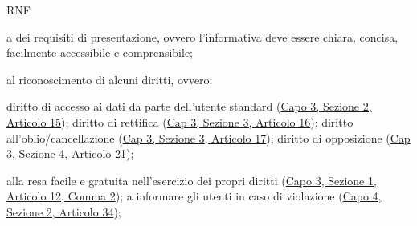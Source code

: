 \begin{listaPersonale}{RNF}
\begin{listaPersonale2}[RNF]{}
             a dei requisiti di presentazione, ovvero l'informativa deve essere chiara, concisa, facilmente accessibile e comprensibile;

             al riconoscimento di alcuni diritti, ovvero:
            \begin{listaPersonale3}[RNF]{}
                   diritto di accesso ai dati da parte dell'utente standard (\href{https://eur-lex.europa.eu/legal-content/IT/TXT/?uri=uriserv:OJ.L_.2016.119.01.0001.01.ITA&toc=OJ:L:2016:119:TOC#d1e2520-1-1}{Capo 3, Sezione 2, Articolo 15});
                   diritto di rettifica (\href{https://eur-lex.europa.eu/legal-content/IT/TXT/?uri=uriserv:OJ.L_.2016.119.01.0001.01.ITA&toc=OJ:L:2016:119:TOC#d1e2606-1-1}{Cap 3, Sezione 3, Articolo 16});
                   diritto all'oblio/cancellazione (\href{https://eur-lex.europa.eu/legal-content/IT/TXT/?uri=uriserv:OJ.L_.2016.119.01.0001.01.ITA&toc=OJ:L:2016:119:TOC#d1e2613-1-1}{Cap 3, Sezione 3, Articolo 17});
                   diritto di opposizione (\href{https://eur-lex.europa.eu/legal-content/IT/TXT/?uri=uriserv:OJ.L_.2016.119.01.0001.01.ITA&toc=OJ:L:2016:119:TOC#d1e2810-1-1}{Cap 3, Sezione 4, Articolo 21});
            \end{listaPersonale3}

             alla resa facile e gratuita nell'esercizio dei propri diritti (\href{https://eur-lex.europa.eu/legal-content/IT/TXT/?uri=uriserv:OJ.L_.2016.119.01.0001.01.ITA&toc=OJ:L:2016:119:TOC#d1e2189-1-1}{Capo 3, Sezione 1, Articolo 12, Comma 2});
             a informare gli utenti in caso di violazione (\href{https://eur-lex.europa.eu/legal-content/IT/TXT/?uri=uriserv:OJ.L_.2016.119.01.0001.01.ITA&toc=OJ:L:2016:119:TOC#d1e3497-1-1}{Capo 4, Sezione 2, Articolo 34});
      \end{listaPersonale2}



\end{listaPersonale}
